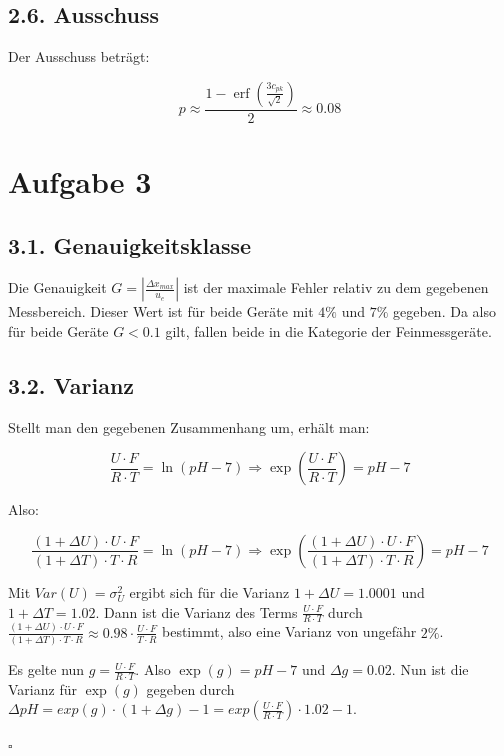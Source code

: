 \documentclass[12pt,a4paper]{article}
\DeclareMathOperator\erf{erf}
\begin{document}
\subsection*{2.6. Ausschuss}
Der Ausschuss beträgt:

\[
p \approx \frac{1 - \erf\left(\frac{3 c_{pk}}{\sqrt{2}}\right)}{2} \approx 0.08
\]

\pagebreak
\section*{Aufgabe 3}
\subsection*{3.1. Genauigkeitsklasse}
Die Genauigkeit $G = \left| \frac{\Delta x_{max}}{u_e} \right|$ ist der maximale Fehler relativ zu dem gegebenen Messbereich. Dieser Wert ist für beide Geräte mit $4\%$ und $7\%$ gegeben. Da also für beide Geräte $G < 0.1$ gilt, fallen beide in die Kategorie der Feinmessgeräte.

\subsection*{3.2. Varianz}
Stellt man den gegebenen Zusammenhang um, erhält man:

\[
\frac{U \cdot F}{R \cdot T} = \ln(pH - 7) \Rightarrow \exp\left(\frac{U \cdot F}{R \cdot T}\right) = pH - 7
\]

Also:

\[
\frac{(1 + \Delta U) \cdot U \cdot F}{(1 + \Delta T) \cdot T \cdot R} = \ln(pH - 7) \Rightarrow \exp\left(\frac{(1 + \Delta U) \cdot U \cdot F}{(1 + \Delta T) \cdot T \cdot R}\right) = pH - 7
\]

Mit $Var(U) = \sigma_U^2$ ergibt sich für die Varianz $1 + \Delta U = 1.0001$ und $1 + \Delta T = 1.02$. Dann ist die Varianz des Terms $\frac{U \cdot F}{R \cdot T}$ durch $\frac{(1 + \Delta U) \cdot U \cdot F}{(1 + \Delta T) \cdot T \cdot R} \approx 0.98 \cdot \frac{U \cdot F}{T \cdot R}$ bestimmt, also eine Varianz von ungefähr $2\%$.

Es gelte nun $g = \frac{U \cdot F}{R \cdot T}$. Also $\exp(g) = pH - 7$ und $\Delta g = 0.02$. Nun ist die Varianz für $\exp(g)$ gegeben durch $\Delta pH = exp(g) \cdot (1 + \Delta g) - 1 = exp\left(\frac{U \cdot F}{R \cdot T}\right) \cdot 1.02 -1$.
\begin{flushright}
$\square$
\end{flushright}
\end{document}
